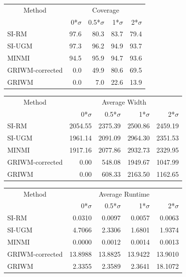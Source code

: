 \documentclass[
]{article}
\begin{document}
\begin{tabular}{lrrrr}
\toprule
\multicolumn{1}{c}{Method} & \multicolumn{4}{c}{Coverage} \\
 & 0*$\sigma$ & 0.5*$\sigma$ & 1*$\sigma$ & 2*$\sigma$\\
\midrule
SI-RM & 97.6 & 80.3 & 83.7 & 79.4\\
SI-UGM & 97.3 & 96.2 & 94.9 & 93.7\\
MINMI & 94.5 & 95.9 & 94.7 & 93.6\\
GRIWM-corrected & 0.0 & 49.9 & 80.6 & 69.5\\
GRIWM & 0.0 & 7.0 & 22.6 & 13.9\\
\bottomrule
\end{tabular}

\begin{tabular}{lrrrr}
\toprule
\multicolumn{1}{c}{Method} & \multicolumn{4}{c}{Average Width} \\
 & 0*$\sigma$ & 0.5*$\sigma$ & 1*$\sigma$ & 2*$\sigma$\\
\midrule
SI-RM & 2054.55 & 2375.39 & 2500.86 & 2459.19\\
SI-UGM & 1961.14 & 2091.09 & 2964.30 & 2351.53\\
MINMI & 1917.16 & 2077.86 & 2932.73 & 2329.95\\
GRIWM-corrected & 0.00 & 548.08 & 1949.67 & 1047.99\\
GRIWM & 0.00 & 608.33 & 2163.50 & 1162.65\\
\bottomrule
\end{tabular}

\begin{tabular}{lrrrr}
\toprule
\multicolumn{1}{c}{Method} & \multicolumn{4}{c}{Average Runtime} \\
 & 0*$\sigma$ & 0.5*$\sigma$ & 1*$\sigma$ & 2*$\sigma$\\
\midrule
SI-RM & 0.0310 & 0.0097 & 0.0057 & 0.0063\\
SI-UGM & 4.7066 & 2.3306 & 1.6801 & 1.9374\\
MINMI & 0.0000 & 0.0012 & 0.0014 & 0.0013\\
GRIWM-corrected & 13.8988 & 13.8825 & 13.9422 & 13.9010\\
GRIWM & 2.3355 & 2.3589 & 2.3641 & 18.1072\\
\bottomrule
\end{tabular}
\end{document}
